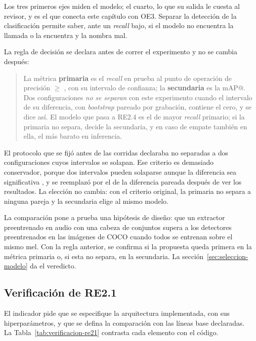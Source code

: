 Los tres primeros ejes miden el modelo; el cuarto, lo que su salida le cuesta al
revisor, y es el que conecta este capítulo con OE3. Separar la detección de la
clasificación permite saber, ante un \textit{recall} bajo, si el modelo no
encuentra la llamada o la encuentra y la nombra mal.

La regla de decisión se declara antes de correr el experimento y no se cambia
después:

\begin{quote}
    La métrica \textbf{primaria} es el \textit{recall} en prueba al punto de
    operación de precisión $\geq$ \pMinPrecision{}, con su intervalo de
    confianza; la \textbf{secundaria} es la mAP@\pMatchIou{}. Dos configuraciones
    \emph{no se separan} con este experimento cuando el intervalo de su
    diferencia, con \textit{bootstrap} pareado por grabación, contiene el cero, y
    se dice así. El modelo que pasa a RE2.4 es el de mayor \textit{recall} primario;
    si la primaria no separa, decide la secundaria, y en caso de empate también
    en ella, el más barato en inferencia.
\end{quote}

El protocolo que se fijó antes de las corridas declaraba no separadas a dos
configuraciones cuyos intervalos se solapan. Ese criterio es demasiado
conservador, porque dos intervalos pueden solaparse aunque la diferencia sea
significativa \citep{efron_bootstrap_1993}, y se reemplazó por el de la diferencia
pareada después de ver los resultados. La elección no cambia: con el criterio
original, la primaria no separa a ninguna pareja y la secundaria elige al mismo
modelo.

La comparación pone a prueba una hipótesis de diseño: que un extractor
preentrenado en audio con una cabeza de conjuntos supera a los detectores
preentrenados en las imágenes de COCO cuando todos se entrenan sobre el mismo
mel. Con la regla anterior, se confirma si la propuesta queda primera en la
métrica primaria o, si esta no separa, en la secundaria. La
sección~\ref{sec:seleccion-modelo} da el veredicto.

\subsection{Verificación de RE2.1}
\label{sec:verificacion-re21}

El indicador pide que se especifique la arquitectura implementada, con sus
hiperparámetros, y que se defina la comparación con las líneas base declaradas.
La Tabla~\ref{tab:verificacion-re21} contrasta cada elemento con el código.

